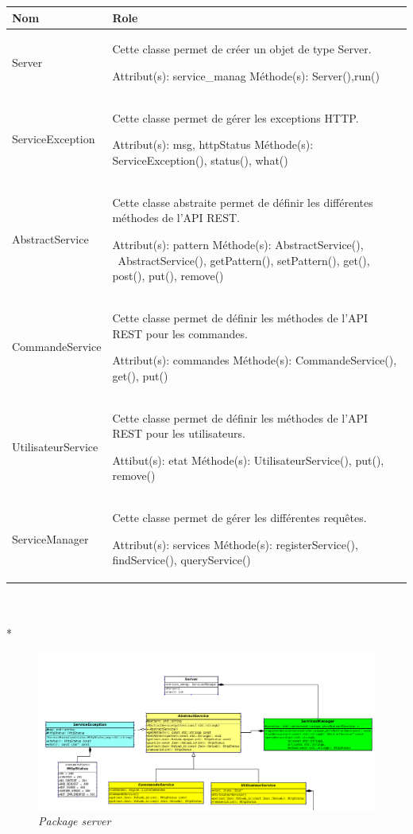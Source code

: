\documentclass[11pt, a4paper]{article}
\begin{document}
 \begin{tabularx}{\textwidth}{ |l|X| }
\hline
   \textbf{Nom} & \textbf{Role}
 \\
\hline

   Server & Cette classe permet de créer un objet de type Server.
   
Attribut(s): service\_manag
\newline
Méthode(s): Server(),run()
 \\
\hline

    ServiceException & Cette classe permet de gérer les exceptions HTTP.
    
Attribut(s): msg, httpStatus
\newline
Méthode(s): ServiceException(), status(), what()
  \\
\hline

    AbstractService & Cette classe abstraite permet de définir les différentes méthodes de l'API REST.
    
Attribut(s): pattern
\newline
Méthode(s): AbstractService(), ~AbstractService(), getPattern(), setPattern(), get(), post(), put(), remove()
  \\
\hline

    CommandeService & Cette classe permet de définir les méthodes de l'API REST pour les commandes.

Attribut(s): commandes
\newline
Méthode(s): CommandeService(), get(), put()
  \\
\hline

    UtilisateurService & Cette classe permet de définir les méthodes de l'API REST pour les utilisateurs.

Attibut(s): etat
\newline
Méthode(s): UtilisateurService(), put(), remove()
  \\
\hline

    ServiceManager & Cette classe permet de gérer les différentes requêtes.
    
Attribut(s): services
\newline
Méthode(s): registerService(), findService(), queryService()
  \\
\hline

   
\end{tabularx}\\ \\*

\begin{figure}[H]
  \centering
  \includegraphics[scale=0.40]{img/package_Server.png}
  \caption{\emph{Package server}}
\end{figure}
\end{document}
